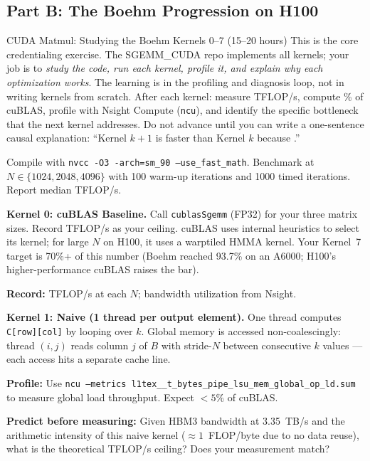 \subsection{Part B: The Boehm Progression on H100}

\begin{exercise}{CUDA Matmul: Studying the Boehm Kernels 0--7 (15--20 hours)}
This is the core credentialing exercise. The SGEMM\_CUDA repo implements all kernels; your job is to \textit{study the code, run each kernel, profile it, and explain why each optimization works}. The learning is in the profiling and diagnosis loop, not in writing kernels from scratch. After each kernel: measure TFLOP/s, compute \% of cuBLAS, profile with Nsight Compute (\texttt{ncu}), and identify the specific bottleneck that the next kernel addresses. Do not advance until you can write a one-sentence causal explanation: ``Kernel $k+1$ is faster than Kernel $k$ because \underline{\phantom{xxx}}.''

Compile with \texttt{nvcc -O3 -arch=sm\_90 --use\_fast\_math}. Benchmark at $N \in \{1024, 2048, 4096\}$ with 100 warm-up iterations and 1000 timed iterations. Report median TFLOP/s.

\medskip
\textbf{Kernel 0: cuBLAS Baseline.}
Call \texttt{cublasSgemm} (FP32) for your three matrix sizes. Record TFLOP/s as your ceiling. cuBLAS uses internal heuristics to select its kernel; for large $N$ on H100, it uses a warptiled HMMA kernel. Your Kernel~7 target is 70\%+ of this number (Boehm reached 93.7\% on an A6000; H100's higher-performance cuBLAS raises the bar).

\textbf{Record:} TFLOP/s at each $N$; bandwidth utilization from Nsight.

\medskip
\textbf{Kernel 1: Naive (1 thread per output element).}
One thread computes \texttt{C[row][col]} by looping over $k$. Global memory is accessed non-coalescingly: thread $(i,j)$ reads column $j$ of $B$ with stride-$N$ between consecutive $k$ values --- each access hits a separate cache line.

\textbf{Profile:} Use \texttt{ncu --metrics l1tex\_\_t\_bytes\_pipe\_lsu\_mem\_global\_op\_ld.sum} to measure global load throughput. Expect $<5\%$ of cuBLAS.

\textbf{Predict before measuring:} Given HBM3 bandwidth at 3.35~TB/s and the arithmetic intensity of this naive kernel ($\approx 1$~FLOP/byte due to no data reuse), what is the theoretical TFLOP/s ceiling? Does your measurement match?


\end{exercise}
